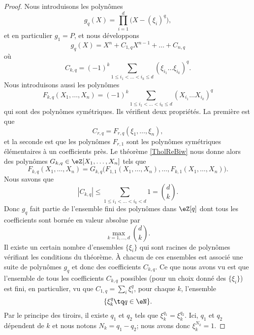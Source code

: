 \begin{proof}
    Nous introduisons les polynômes
    \begin{equation}
        g_q(X)=\prod_{i=1}^d\big( X-(\xi_i)^q \big),
    \end{equation}
    et en particulier \( g_1=P\), et nous développons
    \begin{equation}
        g_q(X)=X^n+C_{1,q}X^{n-1}+\ldots +C_{n,q}
    \end{equation}
    où
    \begin{equation}
        C_{k,q}=(-1)^k\sum_{1\leq i_1<\ldots<i_k\leq d}(\xi_{i_1}\ldots \xi_{i_k})^q.
    \end{equation}
    Nous introduisons aussi les polynômes
    \begin{equation}
        F_{k,q}(X_1,\ldots, X_n)=(-1)^k\sum_{1\leq i_1<\ldots< i_k\leq d}(X_{i_1}\ldots X_{i_k})^q
    \end{equation}
    qui sont des polynômes symétriques. Ils vérifient deux propriétés. La première est que
    \begin{equation}
        C_{r,q}=F_{r,q}(\xi_1,\ldots, \xi_n),
    \end{equation}
    et la seconde est que les polynômes \( F_{r,1}\) sont les polynômes symétriques élémentaires à un coefficients près. Le théorème \ref{TholReBiw} nous donne alors des polynômes \( G_{k,q}\in \eZ[X_1,\ldots, X_n]\) tels que
    \begin{equation}
        F_{k,q}(X_1,\ldots, X_n)=G_{k,q}\big( F_{1,1}(X_1,\ldots, X_n),\ldots, F_{k,1}(X_1,\ldots, X_n) \big).
    \end{equation}
    Nous savons que
    \begin{equation}
        | C_{k,q} |\leq \sum_{1\leq i_1<\ldots<i_k<d}1={d\choose k}.
    \end{equation}
    Donc \( g_q\) fait partie de l'ensemble fini des polynômes dans \( \eZ[q]\) dont tous les coefficients sont bornée en valeur absolue par 
    \begin{equation}
        \max_{k=1,\ldots, d}{d\choose k}.
    \end{equation}
    Il existe un certain nombre d'ensembles \( \{ \xi_i \}\) qui sont racines de polynômes vérifiant les conditions du théorème. À chacun de ces ensembles est associé une suite de polynômes \( g_q\) et donc des coefficients \( C_{k,q}\). Ce que nous avons vu est que l'ensemble de tous les coefficients \( C_{k,q}\) possibles (pour un choix donné des \( \{ \xi_i \}\)) est fini, en particulier, vu que \( C_{1,q}=\sum_i\xi_i^q\), pour chaque \( k\), l'ensemble
    \begin{equation}
        \{ \xi_k^q\tq q\in \eN \}.
    \end{equation}
    Par le principe des tiroirs, il existe \( q_1\) et \( q_2\) tels que \( \xi_k^{q_1}=\xi_k^{q_2}\). Ici, \( q_1\) et \( q_2\) dépendent de \( k\) et nous notons \( N_k=q_1-q_2\); nous avons donc \( \xi_k^{N_k}=1\).


\end{proof}
